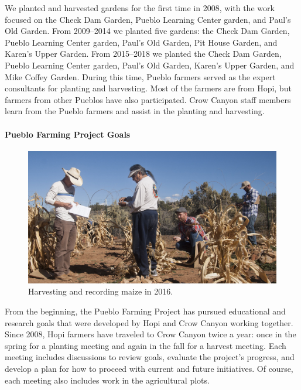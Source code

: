 \documentclass[12pt,]{article}
\let\oldparagraph\paragraph
\renewcommand{\paragraph}[1]{\oldparagraph{#1}\mbox{}}
\begin{document}
We planted and harvested gardens for the first time in 2008, with the work focused on the Check Dam Garden, Pueblo Learning Center garden, and Paul's Old Garden. From 2009--2014 we planted five gardens: the Check Dam Garden, Pueblo Learning Center garden, Paul's Old Garden, Pit House Garden, and Karen's Upper Garden. From 2015--2018 we planted the Check Dam Garden, Pueblo Learning Center garden, Paul's Old Garden, Karen's Upper Garden, and Mike Coffey Garden. During this time, Pueblo farmers served as the expert consultants for planting and harvesting. Most of the farmers are from Hopi, but farmers from other Pueblos have also participated. Crow Canyon staff members learn from the Pueblo farmers and assist in the planting and harvesting.

\hypertarget{pueblo-farming-project-goals}{%
\paragraph{Pueblo Farming Project Goals}\label{pueblo-farming-project-goals}}

\begin{figure}
\centering
\includegraphics{./images/harvesting_2.jpg}
\caption{Harvesting and recording maize in 2016.}
\end{figure}

From the beginning, the Pueblo Farming Project has pursued educational and research goals that were developed by Hopi and Crow Canyon working together. Since 2008, Hopi farmers have traveled to Crow Canyon twice a year: once in the spring for a planting meeting and again in the fall for a harvest meeting. Each meeting includes discussions to review goals, evaluate the project's progress, and develop a plan for how to proceed with current and future initiatives. Of course, each meeting also includes work in the agricultural plots.
\end{document}
